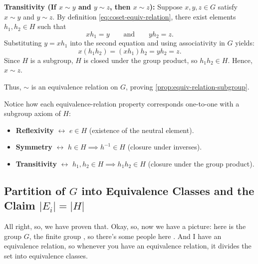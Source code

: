 \begin{proofWrapper}
\begin{content}
\textbf{Transitivity (If $x \sim y$ and $y \sim z$, then $x \sim z$):} Suppose $x, y, z \in G$ satisfy $x \sim y$ and $y \sim z$. By definition \eqref{eq:coset-equiv-relation}, there exist elements $h_1, h_2 \in H$ such that
\[
x h_1 = y \qquad \text{and} \qquad y h_2 = z.
\]
Substituting $y = x h_1$ into the second equation and using associativity in $G$ yields:
\[
x (h_1 h_2) = (x h_1) h_2 = y h_2 = z.
\]
Since $H$ is a subgroup, $H$ is closed under the group product, so $h_1 h_2 \in H$. Hence, $x \sim z$.

Thus, $\sim$ is an equivalence relation on $G$, proving \cref{prop:equiv-relation-subgroup}.

\begin{steps}
Notice how each equivalence-relation property corresponds one-to-one with a subgroup axiom of $H$:
\begin{itemize}
    \item \textbf{Reflexivity} $\longleftrightarrow$ $e \in H$ (existence of the neutral element).
    \item \textbf{Symmetry} $\longleftrightarrow$ $h \in H \implies h^{-1} \in H$ (closure under inverses).
    \item \textbf{Transitivity} $\longleftrightarrow$ $h_1, h_2 \in H \implies h_1 h_2 \in H$ (closure under the group product).
\end{itemize}
\end{steps}
\end{content}

\begin{hidden}
\end{hidden}

\subsection{Partition of \texorpdfstring{$G$}{G} into Equivalence Classes and the Claim \texorpdfstring{$|E_i| = |H|$}{|Ei| = |H|}}

\begin{speech}[00:18:54 - 00:20:32]
All right, so, we have proven that. Okay, so, now we have a picture: here is the group $G$, the finite group , so there's some people here . And I have an equivalence relation, so whenever you have an equivalence relation, it divides the set into equivalence classes.


\end{speech}
\end{proofWrapper}
